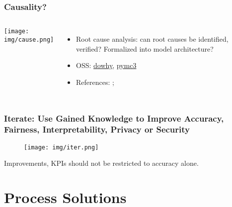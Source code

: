 \documentclass[11pt,
               aspectratio=169,
               hyperref={colorlinks}
               ]{beamer}
\begin{document}
			\begin{frame}
			
				\frametitle{Causality?}	
				
				\begin{columns}
		
					\centering
					\texttt{[image: img/cause.png]}
					
					\begin{itemize}
						\item Root cause analysis: can root causes be identified, verified? Formalized into model architecture? 
						\item OSS: \href{https://github.com/microsoft/dowhy}{dowhy}, \href{https://docs.pymc.io/}{pymc3}
						\item References: ; 
					\end{itemize}
					
				\end{columns}
				
			\end{frame}
	
			\begin{frame}	
	
				\frametitle{Iterate: Use Gained Knowledge to Improve Accuracy, Fairness, Interpretability, Privacy or Security}		
				
				\begin{figure}[htb]
					\begin{center}
						\texttt{[image: img/iter.png]}
						\label{fig:blueprint}
					\end{center}
				\end{figure}	
	
				\centering
				Improvements, KPIs should not be restricted to accuracy alone.
			
			\end{frame}

	\section{Process Solutions}
\end{document}
